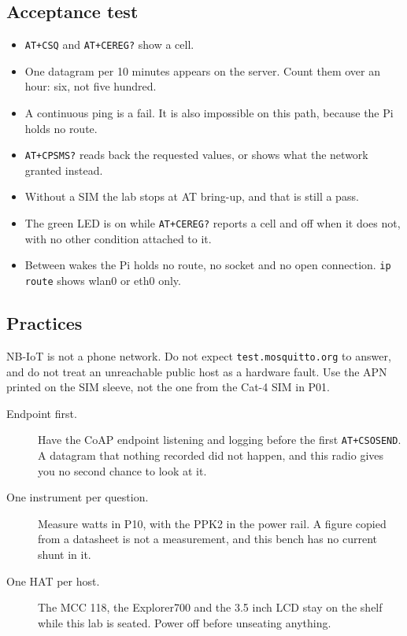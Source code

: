 \subsection*{Acceptance test}

\begin{itemize}
\item \texttt{AT+CSQ} and \texttt{AT+CEREG?} show a cell.
\item One datagram per 10 minutes appears on the server. Count them over an hour: six, not five hundred.
\item A continuous ping is a fail. It is also impossible on this path, because the Pi holds no route.
\item \texttt{AT+CPSMS?} reads back the requested values, or shows what the network granted instead.
\item Without a SIM the lab stops at AT bring-up, and that is still a pass.
\item The green LED is on while \texttt{AT+CEREG?} reports a cell and off when it does not, with no other condition attached to it.
\item Between wakes the Pi holds no route, no socket and no open connection. \texttt{ip route} shows wlan0 or eth0 only.
\end{itemize}

\subsection*{Practices}

NB-IoT is not a phone network. Do not expect \texttt{test.mosquitto.org} to answer, and do not treat an unreachable public host as a hardware fault. Use the APN printed on the SIM sleeve, not the one from the Cat-4 SIM in P01.

\begin{description}
\item[Endpoint first.] Have the CoAP endpoint listening and logging before the first \texttt{AT+CSOSEND}. A datagram that nothing recorded did not happen, and this radio gives you no second chance to look at it.
\item[One instrument per question.] Measure watts in P10, with the PPK2 in the power rail. A figure copied from a datasheet is not a measurement, and this bench has no current shunt in it.
\item[One HAT per host.] The MCC 118, the Explorer700 and the 3.5 inch LCD stay on the shelf while this lab is seated. Power off before unseating anything.
\end{description}

